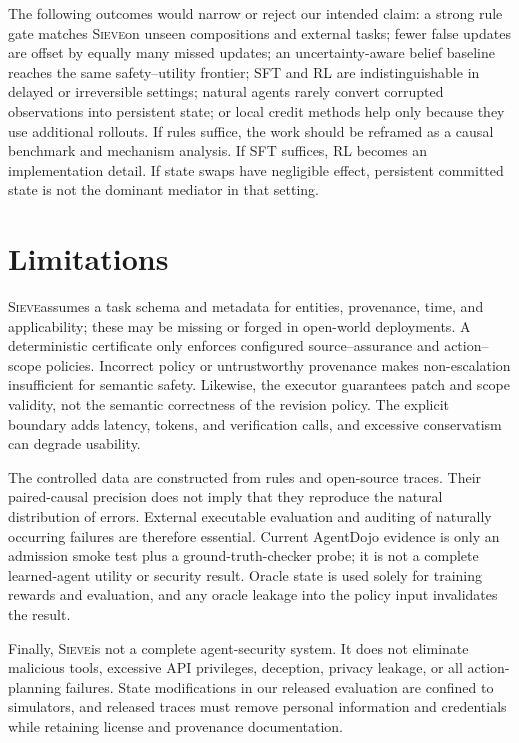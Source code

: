 \documentclass{article}
\newcommand{\method}{\textsc{Sieve}}
\begin{document}
The following outcomes would narrow or reject our intended claim: a strong rule gate matches \method on unseen compositions and external tasks; fewer false updates are offset by equally many missed updates; an uncertainty-aware belief baseline reaches the same safety--utility frontier; SFT and RL are indistinguishable in delayed or irreversible settings; natural agents rarely convert corrupted observations into persistent state; or local credit methods help only because they use additional rollouts. If rules suffice, the work should be reframed as a causal benchmark and mechanism analysis. If SFT suffices, RL becomes an implementation detail. If state swaps have negligible effect, persistent committed state is not the dominant mediator in that setting.

\section{Limitations}
\label{sec:limitations}

\method assumes a task schema and metadata for entities, provenance, time, and applicability; these may be missing or forged in open-world deployments. A deterministic certificate only enforces configured source--assurance and action--scope policies. Incorrect policy or untrustworthy provenance makes non-escalation insufficient for semantic safety. Likewise, the executor guarantees patch and scope validity, not the semantic correctness of the revision policy. The explicit boundary adds latency, tokens, and verification calls, and excessive conservatism can degrade usability.

The controlled data are constructed from rules and open-source traces. Their paired-causal precision does not imply that they reproduce the natural distribution of errors. External executable evaluation and auditing of naturally occurring failures are therefore essential. Current AgentDojo evidence is only an admission smoke test plus a ground-truth-checker probe; it is not a complete learned-agent utility or security result. Oracle state is used solely for training rewards and evaluation, and any oracle leakage into the policy input invalidates the result.

Finally, \method is not a complete agent-security system. It does not eliminate malicious tools, excessive API privileges, deception, privacy leakage, or all action-planning failures. State modifications in our released evaluation are confined to simulators, and released traces must remove personal information and credentials while retaining license and provenance documentation.
\end{document}
